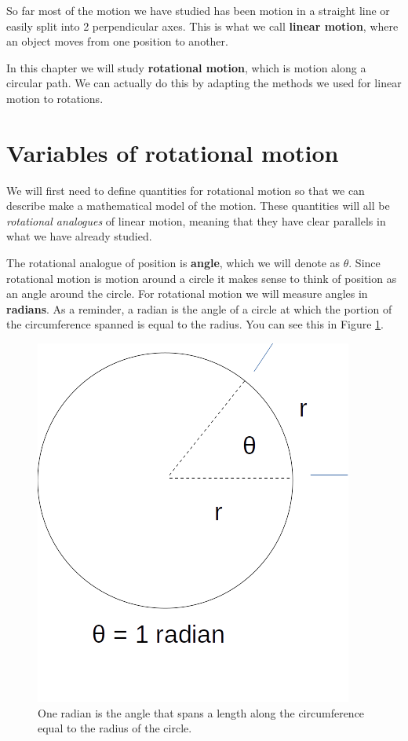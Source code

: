 \documentclass[12pt]{book}
\begin{document}
So far most of the motion we have studied has been motion in a straight line or easily split into 2 perpendicular axes. This is what we call \textbf{linear motion}, where an object moves from one position to another.

In this chapter we will study \textbf{rotational motion}, which is motion along a circular path. We can actually do this by adapting the methods we used for linear motion to rotations.

\section{Variables of rotational motion}

We will first need to define quantities for rotational motion so that we can describe make a mathematical model of the motion. These quantities will all be \textit{rotational analogues} of linear motion, meaning that they have clear parallels in what we have already studied.

The rotational analogue of position is \textbf{angle}, which we will denote as $\theta$. Since rotational motion is motion around a circle it makes sense to think of position as an angle around the circle. For rotational motion we will measure angles in \textbf{radians}. As a reminder, a radian is the angle of a circle at which the portion of the circumference spanned is equal to the radius. You can see this in Figure \ref{radian}.

\begin{figure}[H]
\centering
\includegraphics[scale=0.5]{radian_def.png}
\caption{One radian is the angle that spans a length along the circumference equal to the radius of the circle.}
\label{radian}
\end{figure}
\end{document}
